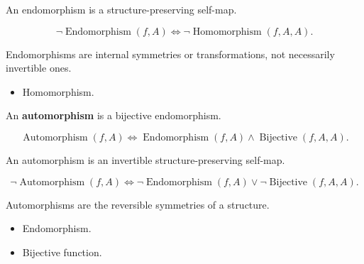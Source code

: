 \begin{remark*}
An endomorphism is a structure-preserving self-map.
\end{remark*}

\begin{remark*}
\[
\neg\operatorname{Endomorphism}(f,A)
\Longleftrightarrow
\neg\operatorname{Homomorphism}(f,A,A).
\]
\end{remark*}

\begin{remark*}[Interpretation]
Endomorphisms are internal symmetries or transformations, not necessarily
invertible ones.
\end{remark*}

\begin{remark*}[Dependencies]
\begin{itemize}
  \item Homomorphism.
\end{itemize}
\end{remark*}

\begin{definition}[Automorphism]
\label{def:automorphism}
An \textbf{automorphism} is a bijective endomorphism.
\end{definition}

\begin{remark*}
\[
\operatorname{Automorphism}(f,A)
\Longleftrightarrow
\operatorname{Endomorphism}(f,A)
\land
\operatorname{Bijective}(f,A,A).
\]
\end{remark*}

\begin{remark*}
An automorphism is an invertible structure-preserving self-map.
\end{remark*}

\begin{remark*}
\[
\neg\operatorname{Automorphism}(f,A)
\Longleftrightarrow
\neg\operatorname{Endomorphism}(f,A)
\lor
\neg\operatorname{Bijective}(f,A,A).
\]
\end{remark*}

\begin{remark*}[Interpretation]
Automorphisms are the reversible symmetries of a structure.
\end{remark*}

\begin{remark*}[Dependencies]
\begin{itemize}
  \item Endomorphism.
  \item Bijective function.
\end{itemize}
\end{remark*}
